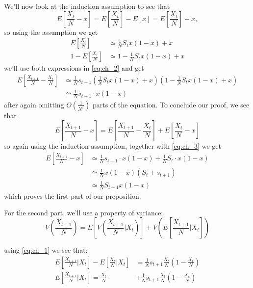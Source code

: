 \documentclass[11pt]{article}
\begin{document}
We'll now look at the induction assumption to see that
\begin{equation}
E\left[\frac{X_t}{N}-x\right]=E\left[\frac{X_t}{N}\right]-E[x]=E\left[\frac{X_t}{N}\right]-x ,
\end{equation}
so using the assumption we get
\begin{equation}
\begin{split}
E\left[\frac{X_t}{N}\right] &\simeq \frac{1}{N} S_t x(1-x)+x \\
1 - E\left[\frac{X_t}{N}\right] &\simeq 1- \frac{1}{N} S_t x(1-x)+x
\end{split}
\end{equation}
we'll use both expressions in \cref{eq:ch_2} and get
\begin{equation}\label{eq:ch_3}
\begin{split}
E\left[\frac{X_{t+1}}{N}-\frac{X_t}{N}\right] &\simeq \frac{1}{N}s_{t+1} \left(\frac{1}{N} S_t x(1-x)+x \right)\left(1- \frac{1}{N} S_t x(1-x)+x \right) \\
&\simeq  \frac{1}{N}s_{t+1}\cdot x(1-x)
\end{split}
\end{equation}
after again omitting $O(\frac{1}{N^2})$ parts of the equation.
To conclude our proof, we see that
\begin{equation}
E\left[\frac{X_{t+1}}{N}-x\right] = E\left[\frac{X_{t+1}}{N}-\frac{X_t}{N}\right] + E\left[\frac{X_t}{N}-x\right]
\end{equation}
so again using the induction assumption, together with \cref{eq:ch_3} we get
\begin{equation}
\begin{split}
E\left[\frac{X_{t+1}}{N}-x\right] &\simeq \frac{1}{N}s_{t+1}\cdot x(1-x) + \frac{1}{N}S_t\cdot x(1-x) \\
& \simeq \frac{1}{N}x(1-x)(S_t + s_{t+1}) \\
& \simeq \frac{1}{N} S_{t+1} x(1-x)
\end{split}
\end{equation}
which proves the first part of our preposition.

For the second part, we'll use a property of variance:
\begin{equation}\label{eq:ch_var}
V\left(\frac{X_{t+1}}{N}\right) = E\left[V\left(\frac{X_{t+1}}{N} \bigg|X_t \right)\right] + V\left(E\left[\frac{X_{t+1}}{N} \bigg|X_t \right]\right)
\end{equation}

using \cref{eq:ch_1} we see that:
\begin{equation}\label{eq:ch_var1}
\begin{split}
E\left[\frac{X_{t+1}}{N} \bigg|X_t \right] - E\left[\frac{X_{t}}{N} \bigg|X_t \right] &= \frac{1}{N}s_{t+1}\frac{X_t}{N}\left(1-\frac{X_t}{N} \right) \\
E\left[\frac{X_{t+1}}{N} \bigg|X_t \right] = \frac{X_t}{N} &+ \frac{1}{N}s_{t+1}\frac{X_t}{N}\left(1-\frac{X_t}{N} \right)
\end{split}
\end{equation}
\end{document}
